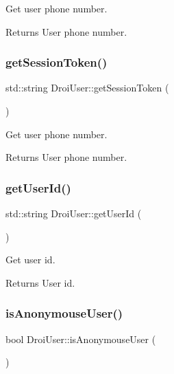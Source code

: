 Get user phone number. \begin{DoxyReturn}{Returns}
User phone number. 
\end{DoxyReturn}
\mbox{\label{class_droi_user_a08f406ceef3b33e5a8f8e37c60cdfde3}} 
\subsubsection{\texorpdfstring{get\+Session\+Token()}{getSessionToken()}}
{\footnotesize\ttfamily std\+::string Droi\+User\+::get\+Session\+Token (\begin{DoxyParamCaption}{ }\end{DoxyParamCaption})}

Get user phone number. \begin{DoxyReturn}{Returns}
User phone number. 
\end{DoxyReturn}
\mbox{\label{class_droi_user_a95d13af36734958546e656b6f1f19ddd}} 
\subsubsection{\texorpdfstring{get\+User\+Id()}{getUserId()}}
{\footnotesize\ttfamily std\+::string Droi\+User\+::get\+User\+Id (\begin{DoxyParamCaption}{ }\end{DoxyParamCaption})}

Get user id. \begin{DoxyReturn}{Returns}
User id. 
\end{DoxyReturn}
\mbox{\label{class_droi_user_a3997fd724988f04f0ec7c346340e2ac5}} 
\subsubsection{\texorpdfstring{is\+Anonymouse\+User()}{isAnonymouseUser()}}
{\footnotesize\ttfamily bool Droi\+User\+::is\+Anonymouse\+User (\begin{DoxyParamCaption}{ }\end{DoxyParamCaption})}

